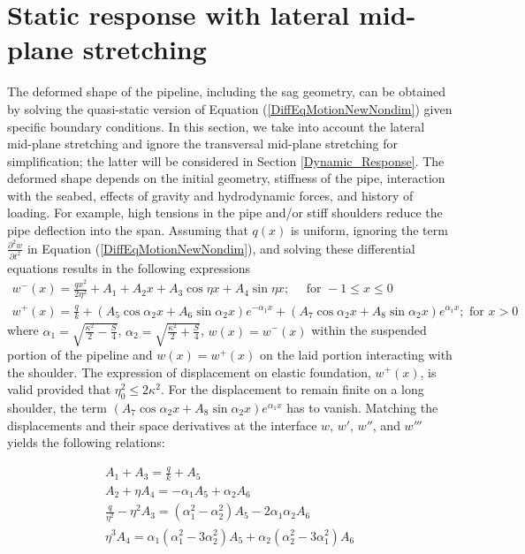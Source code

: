 \documentclass[3p,doublespacing,authoryear,11pt]{elsarticle} %
\begin{document}
\section{Static response with lateral mid-plane stretching}
The deformed shape of the pipeline, including the sag geometry, can be obtained by solving the quasi-static version of Equation (\ref{DiffEqMotionNewNondim}) given specific boundary conditions. In this section, we take into account the lateral mid-plane stretching and ignore the transversal mid-plane stretching for simplification; the latter will be considered in Section \ref{Dynamic_Response}. The deformed shape depends on the initial geometry, stiffness of the pipe, interaction with the seabed, effects of gravity and hydrodynamic forces, and history of loading. For example, high tensions in the pipe and/or stiff shoulders reduce the pipe deflection into the span. Assuming that $q(x)$ is uniform, ignoring the term $\frac{\partial^2 w}{\partial t^2}$ in Equation (\ref{DiffEqMotionNewNondim}), and solving these differential equations results in the following expressions 
\begin{equation}\label{StaticSolution}
 \begin{array}{l } 
\displaystyle   w^-(x)=  \frac{q x^2}{2 \eta^2} + A_1 + A_2 x + A_3 \cos \eta x  + A_4 \sin \eta  x; \quad  \text{ for } -1 \le x \le 0 \\
\displaystyle   w^+(x)=  \frac{q }{k} + \left(A_5 \cos \alpha_2 x +  A_6 \sin \alpha_2 x\right)e^{-\alpha_1 x}   +  \left(A_7 \cos \alpha_2 x +  A_8 \sin \alpha_2 x\right)e^{\alpha_1 x} ; \text{ for } x > 0
  \end{array}  
\end{equation}
where $\alpha_1 = \sqrt{\frac{\kappa^2}{2} - \frac{S}{4}}$, $\alpha_2 = \sqrt{\frac{\kappa^2}{2} + \frac{S}{4}}$, $w(x) =w^-(x)$ within the suspended portion of the pipeline and $w(x) =w^+(x)$ on the laid portion interacting with the shoulder. The expression of displacement on elastic foundation, $w^+(x)$, is valid provided that $\eta_0^2 \le 2 \kappa^2$.  For the displacement to remain finite on a long shoulder, the term $\left(A_7 \cos \alpha_2 x +  A_8 \sin \alpha_2 x\right)e^{\alpha_1 x}$ has to vanish. Matching the displacements and their space derivatives at the interface $w$, $w'$, $w''$, and $w'''$ yields the following relations: 

\begin{equation}\label{Continuity}
 \begin{array}{l } 
\displaystyle   A_1 + A_3 = \frac{q}{k}  + A_5\\
\displaystyle   A_2 + \eta A_4 = -\alpha_1 A_5 + \alpha_2 A_6 \\
\displaystyle   \frac{q}{\eta^2} - \eta^2 A_3 = (\alpha_1^2 - \alpha_2^2) A_5 - 2 \alpha_1 \alpha_2 A_6 \\
\displaystyle   \eta^3 A_4 = \alpha_1 (\alpha_1^2 - 3 \alpha_2^2) A_5 + \alpha_2 (\alpha_2^2 - 3 \alpha_1^2) A_6 \\
  \end{array}  
\end{equation}
\end{document}
